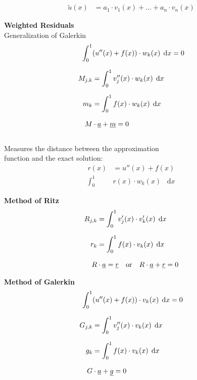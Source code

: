 \documentclass[
final,
a4paper,
oneside,
parskip=full,
headings=standardclasses,
headings=big,
pointednumbers,
fleqn
]{scrartcl}
\newcommand*\difx{\; \mathop{}\!\mathrm{d}x}
\newcommand{\kl}[1]{{\left( #1 \right)}}
\begin{document}
    
    {\setlength{\abovedisplayskip}{-6pt}
    \setlength{\belowdisplayskip}{-12pt}
    \begin{align*}
        \widetilde{u}\kl{x} & = a_1 \cdot v_1\kl{x} + \ldots + a_n \cdot v_n\kl{x}
    \end{align*}}

    {\bf{Weighted Residuals}} \\
    Generalization of Galerkin \\
    {\setlength{\abovedisplayskip}{-6pt}
    \setlength{\belowdisplayskip}{-12pt}
    \begin{align*}
        \int_{0}^{1}&{\kl{u''\kl{x} + f\kl{x}} \cdot w_k\kl{x} \difx} = 0  \\[0.25cm]
        M_{j,k} & = \int_{0}^{1}{v_j''\kl{x} \cdot w_k\kl{x} \difx}  \\[0.25cm]
        m_k & = \int_{0}^{1}{f\kl{x} \cdot w_k\kl{x} \difx}   \\[0.25cm]
        M &\cdot \uline{a} + \uline{m} = 0
    \end{align*}} \\
    Measures the distance between the approximation\\
    function and the exact solution: \\
    {\setlength{\abovedisplayskip}{-6pt}
    \setlength{\belowdisplayskip}{-12pt}
    \begin{align*}
        r\kl{x} & = u''\kl{x} + f\kl{x} \\[0.25cm]
        \int_{0}^{1}&{r\kl{x} \cdot w_k\kl{x} \difx}
    \end{align*}}
    
    {\bf{Method of Ritz}} \\
    {\setlength{\abovedisplayskip}{-6pt}
    \setlength{\belowdisplayskip}{-12pt}
    \begin{align*}
        R_{j,k} & = \int_{0}^{1}{v_j'\kl{x} \cdot v_k'\kl{x} \difx}  \\[0.25cm]
        r_k &= \int_{0}^{1}{f\kl{x} \cdot v_k\kl{x} \difx}   \\[0.25cm]
        R &\cdot \uline{a} = \uline{r} \quad \text{or} \quad R \cdot \uline{a} + \uline{r} = 0
    \end{align*}}

    {\bf{Method of Galerkin}} \\
    {\setlength{\abovedisplayskip}{-6pt}
    \setlength{\belowdisplayskip}{-12pt}
    \begin{align*}
        \int_{0}^{1}&{\kl{u''\kl{x} + f\kl{x}} \cdot v_k\kl{x} \difx} = 0  \\[0.25cm]
        G_{j,k} & = \int_{0}^{1}{v_j''\kl{x} \cdot v_k\kl{x} \difx}  \\[0.25cm]
        g_k &= \int_{0}^{1}{f\kl{x} \cdot v_k\kl{x} \difx}   \\[0.25cm]
        G &\cdot \uline{a} + \uline{g} = 0
    \end{align*}}
    
\end{document}

